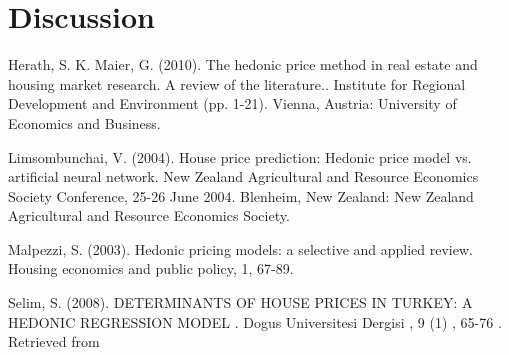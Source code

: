\documentclass[10pt,A4,makeidx]{article}
\begin{document}
\section{Discussion}


\begin{thebibliography}{9}
Herath, S. K. Maier, G. (2010). The hedonic price method in real estate and housing market research. A review of the literature.. Institute for Regional Development and Environment (pp. 1-21). Vienna, Austria: University of Economics and Business.

Limsombunchai, V. (2004). House price prediction: Hedonic price model vs. artificial neural network. New Zealand Agricultural and Resource Economics Society Conference, 25-26 June 2004. Blenheim, New Zealand: New Zealand Agricultural and Resource Economics Society.

Malpezzi, S. (2003). Hedonic pricing models: a selective and applied review. Housing economics and public policy, 1, 67-89.

Selim, S. (2008). DETERMINANTS OF HOUSE PRICES IN TURKEY: A HEDONIC REGRESSION MODEL . Dogus Universitesi Dergisi , 9 (1) , 65-76 . Retrieved from 
\end{thebibliography}
\end{document}
